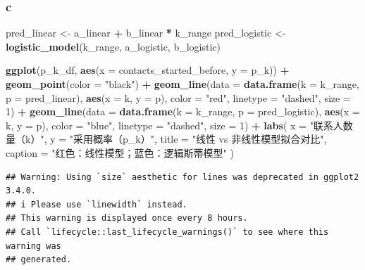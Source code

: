 \documentclass[
]{article}
\newenvironment{Shaded}{\begin{snugshade}}{\end{snugshade}}
\newcommand{\AttributeTok}[1]{\textcolor[rgb]{0.13,0.29,0.53}{#1}}
\newcommand{\DecValTok}[1]{\textcolor[rgb]{0.00,0.00,0.81}{#1}}
\newcommand{\FunctionTok}[1]{\textcolor[rgb]{0.13,0.29,0.53}{\textbf{#1}}}
\newcommand{\NormalTok}[1]{#1}
\newcommand{\OtherTok}[1]{\textcolor[rgb]{0.56,0.35,0.01}{#1}}
\newcommand{\SpecialCharTok}[1]{\textcolor[rgb]{0.81,0.36,0.00}{\textbf{#1}}}
\newcommand{\StringTok}[1]{\textcolor[rgb]{0.31,0.60,0.02}{#1}}
\begin{document}
\subsubsection{c}\label{c-1}

\begin{Shaded}
\begin{Highlighting}[]
\NormalTok{pred\_linear }\OtherTok{\textless{}{-}}\NormalTok{ a\_linear }\SpecialCharTok{+}\NormalTok{ b\_linear }\SpecialCharTok{*}\NormalTok{ k\_range}
\NormalTok{pred\_logistic }\OtherTok{\textless{}{-}} \FunctionTok{logistic\_model}\NormalTok{(k\_range, a\_logistic, b\_logistic)}


\FunctionTok{ggplot}\NormalTok{(p\_k\_df, }\FunctionTok{aes}\NormalTok{(}\AttributeTok{x =}\NormalTok{ contacts\_started\_before, }\AttributeTok{y =}\NormalTok{ p\_k)) }\SpecialCharTok{+} 
  \FunctionTok{geom\_point}\NormalTok{(}\AttributeTok{color =} \StringTok{"black"}\NormalTok{) }\SpecialCharTok{+} 
  \FunctionTok{geom\_line}\NormalTok{(}\AttributeTok{data =} \FunctionTok{data.frame}\NormalTok{(}\AttributeTok{k =}\NormalTok{ k\_range, }\AttributeTok{p =}\NormalTok{ pred\_linear), }
            \FunctionTok{aes}\NormalTok{(}\AttributeTok{x =}\NormalTok{ k, }\AttributeTok{y =}\NormalTok{ p), }\AttributeTok{color =} \StringTok{"red"}\NormalTok{, }\AttributeTok{linetype =} \StringTok{"dashed"}\NormalTok{, }\AttributeTok{size =} \DecValTok{1}\NormalTok{) }\SpecialCharTok{+} 
  \FunctionTok{geom\_line}\NormalTok{(}\AttributeTok{data =} \FunctionTok{data.frame}\NormalTok{(}\AttributeTok{k =}\NormalTok{ k\_range, }\AttributeTok{p =}\NormalTok{ pred\_logistic), }
            \FunctionTok{aes}\NormalTok{(}\AttributeTok{x =}\NormalTok{ k, }\AttributeTok{y =}\NormalTok{ p), }\AttributeTok{color =} \StringTok{"blue"}\NormalTok{, }\AttributeTok{linetype =} \StringTok{"dashed"}\NormalTok{, }\AttributeTok{size =} \DecValTok{1}\NormalTok{) }\SpecialCharTok{+} 
  \FunctionTok{labs}\NormalTok{(}
    \AttributeTok{x =} \StringTok{"联系人数量（k）"}\NormalTok{, }
    \AttributeTok{y =} \StringTok{"采用概率（p\_k）"}\NormalTok{, }
    \AttributeTok{title =} \StringTok{"线性 vs 非线性模型拟合对比"}\NormalTok{,}
    \AttributeTok{caption =} \StringTok{"红色：线性模型；蓝色：逻辑斯蒂模型"}
\NormalTok{  )}
\end{Highlighting}
\end{Shaded}

\begin{verbatim}
## Warning: Using `size` aesthetic for lines was deprecated in ggplot2 3.4.0.
## i Please use `linewidth` instead.
## This warning is displayed once every 8 hours.
## Call `lifecycle::last_lifecycle_warnings()` to see where this warning was
## generated.
\end{verbatim}
\end{document}
